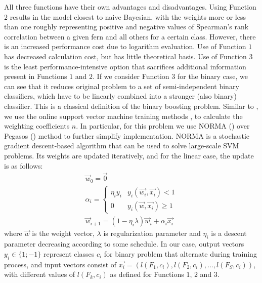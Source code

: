 \documentclass[10pt,twocolumn, a4paper]{article}
\begin{document}
All three functions have their own advantages and disadvantages. Using Function $2$ results in the model closest to naive Bayesian, with the weights more or less than one roughly representing positive and negative values of Spearman’s rank correlation between a given fern and all others for a certain class. However, there is an increased performance cost due to logarithm evaluation. Use of Function $1$ has decreased calculation cost, but has little theoretical basis. Use of Function $3$ is the least performance-intensive option that sacrifices additional information present in Functions $1$ and $2$. 
If we consider Function $3$ for the binary case, we can see that it reduces original problem to a set of semi-independent binary classifiers, which have to be linearly combined into a stronger (also binary) classifier. This is a classical definition of the binary boosting problem. Similar to \cite{Seva}, we use the online support vector machine training methods \cite{Norma}, \cite{Pegasos} to calculate the weighting coefficients $n$. In particular, for this problem we use NORMA (\cite{Norma}) over Pegasos (\cite{Pegasos}) method to further simplify implementation. 
NORMA is a stochastic gradient descent-based algorithm that can be used to solve large-scale SVM problems. Its weights are updated iteratively, and for the linear case, the update is as follows:
\begin{equation}
\label{normath}
\begin{array}{l}
\vec{w}_0=\vec{0} \\
\alpha_{i}=\left\{ \begin{array}{rl}
\eta_i y_i & y_i (\vec{w_i},\vec{x_i})<1\\
0 & y_i (\vec{w},\vec{x_i})\ge 1
\end{array} \right.\\
\vec{w}_{i+1}=(1-\eta_i \lambda)\vec{w}_{i}+\alpha_i \vec{x_i}
\end{array} 
\end{equation}
where $\vec{w}$ is the weight vector, $\lambda$ is regularization parameter and $\eta_i$ is a descent parameter decreasing according to some schedule. In our case, output vectors $y_i\in\{1;-1\}$ represent classes $c_i$ for binary problem that alternate during training process, and input vectors consist of $\vec{x_i}=(l(F_1,c_i),l(F_2,c_i),...,l(F_S,c_i))$, with different values of $l(F_k,c_i)$ as defined for Functions $1$, $2$ and $3$. 
\end{document}
